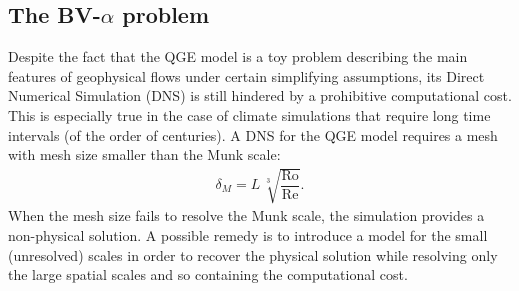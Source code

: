 \documentclass[11pt,a4paper]{article}
\begin{document}
\subsection{The BV-$\alpha$ problem}

Despite the fact that the QGE model is a toy problem describing the main features of geophysical flows
under certain simplifying assumptions, its Direct Numerical Simulation (DNS) is still hindered by a prohibitive 
computational cost. This is especially true in the case of climate simulations that require long time intervals
(of the order of centuries). 
A DNS for the QGE model requires a mesh with mesh size smaller than the Munk scale:
\begin{align}
\delta_M = L \, \sqrt[3]{\dfrac{\text{Ro}}{\text{Re}}}. \label{eq:munk}
\end{align}
When the mesh size fails to resolve the Munk scale, the simulation provides a non-physical solution. 
A possible remedy is to introduce a model for the small (unresolved) scales in order to recover the physical solution
while resolving only the large spatial scales and so containing the computational cost. 



\end{document}
